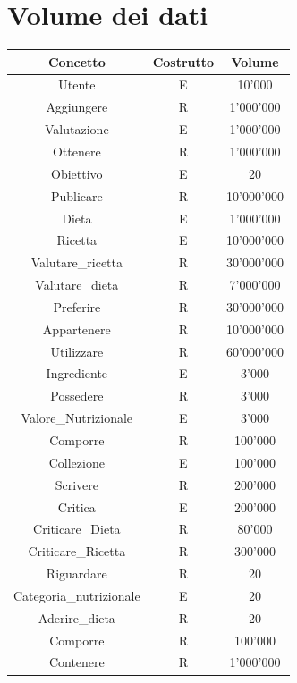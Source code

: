﻿\documentclass[a4paper,12pt]{report}
\begin{document}
\section{Volume dei dati}
\begingroup
\renewcommand{\arraystretch}{1.5}  %
\setlength{\tabcolsep}{10pt}       %
\begin{table}[H]
\center
    \begin{tabular}{|>{\hspace{10pt}}c<{\hspace{10pt}}|>{\hspace{10pt}}c<{\hspace{10pt}}|>{\hspace{10pt}}c<{\hspace{10pt}}|}
        \hline
        Concetto  & Costrutto  & Volume \\
        \hline
        Utente   & E  & 10'000  \\
        Aggiungere   & R  & 1'000'000   \\
        Valutazione   & E   & 1'000'000    \\
        Ottenere & R&  1'000'000 \\
        Obiettivo & E& 20\\
        Publicare & R& 10'000'000\\
        Dieta & E& 1'000'000\\
        Ricetta & E& 10'000'000 \\
        Valutare\_ricetta & R& 30'000'000\\
        Valutare\_dieta &R & 7'000'000\\
        Preferire & R& 30'000'000\\
        Appartenere & R& 10'000'000\\
        Utilizzare & R& 60'000'000\\
        Ingrediente & E& 3'000\\
        Possedere & R& 3'000\\
        Valore\_Nutrizionale & E& 3'000\\
        Comporre & R& 100'000\\
        Collezione & E& 100'000\\
        Scrivere & R& 200'000 \\
        Critica & E& 200'000\\
        Criticare\_Dieta & R& 80'000 \\
        Criticare\_Ricetta & R& 300'000\\
        Riguardare & R& 20\\
        Categoria\_nutrizionale & E&20 \\
        Aderire\_dieta & R& 20\\
        Comporre & R& 100'000\\
        Contenere & R& 1'000'000\\
        \hline
    \end{tabular}  
\end{table}
\endgroup
\end{document}
